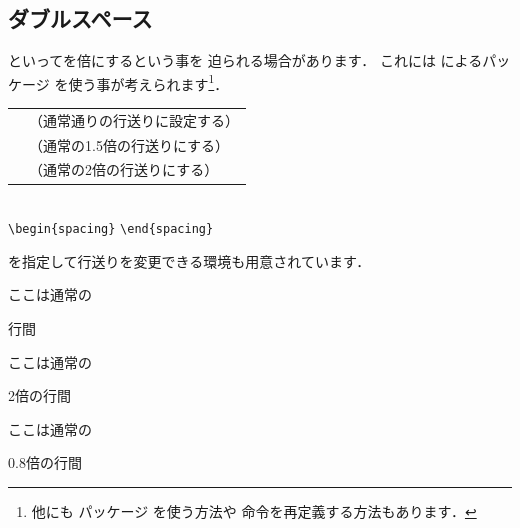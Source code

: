 \subsection{ダブルスペース}



といってを倍にするという事を
迫られる場合があります．
これには によるパッケージ
を使う事が考えられます\footnote{他にも パッケージ
を使う方法や  命令を再定義する方法もあります．}．
\begin{Syntax}
\begin{tabular}{ll}
 \C{singlespacing}   &（通常通りの行送りに設定する）\\
 \C{onehalfspacing}  &（通常の1.5倍の行送りにする）\\
 \C{doublespacing}   &（通常の2倍の行送りにする）\\
\end{tabular}\\
 \verb|\begin{spacing}|  \verb|\end{spacing}|
\end{Syntax}
を指定して行送りを変更できる環境も用意されています．%
\begin{InOut}
\usepackage{setspace}
\singlespacing
ここは通常の\par 行間\par
\doublespacing
ここは通常の\par 2倍の行間\par
\begin{spacing}{.8}
ここは通常の\par 0.8倍の行間\par
\end{spacing}
\end{InOut}



